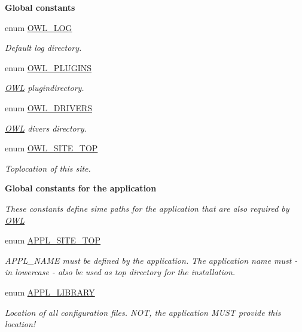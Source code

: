 \begin{Indent}{\bf Global constants}
\begin{DoxyCompactItemize}
enum \hyperlink{OWLloader_8php_ae3fe8a897196b3cb98b8827a9a940ccb}{OWL\_\-LOG} 
\begin{DoxyCompactList}\small\item\em Default log directory. \item\end{DoxyCompactList}\item 
enum \hyperlink{OWLloader_8php_acb1e6e914bd3c0c96fc20ae6bb3a8a99}{OWL\_\-PLUGINS} 
\begin{DoxyCompactList}\small\item\em \hyperlink{classOWL}{OWL} plugindirectory. \item\end{DoxyCompactList}\item 
enum \hyperlink{OWLloader_8php_af6ffde4ef80c21c2e105c89dab9c011e}{OWL\_\-DRIVERS} 
\begin{DoxyCompactList}\small\item\em \hyperlink{classOWL}{OWL} divers directory. \item\end{DoxyCompactList}\item 
enum \hyperlink{OWLloader_8php_a462de9ae02e394313337afac5d1a5f95}{OWL\_\-SITE\_\-TOP} 
\begin{DoxyCompactList}\small\item\em Toplocation of this site. \item\end{DoxyCompactList}\end{DoxyCompactItemize}
\end{Indent}
\begin{Indent}{\bf Global constants for the application}\par
{\em \label{_amgrp3ebb069601fef11bcb0ba759cb17b4d6}
 These constants define sime paths for the application that are also required by \hyperlink{classOWL}{OWL} }\begin{DoxyCompactItemize}
\item 
enum \hyperlink{OWLloader_8php_a17a0c6fb6eda7d05081d16bc519c97b5}{APPL\_\-SITE\_\-TOP} 
\begin{DoxyCompactList}\small\item\em APPL\_\-NAME must be defined by the application. The application name must -\/ in lowercase -\/ also be used as top directory for the installation. \item\end{DoxyCompactList}\item 
enum \hyperlink{OWLloader_8php_a1b19bb6ffba1d1e7871092e086cc4e94}{APPL\_\-LIBRARY} 
\begin{DoxyCompactList}\small\item\em Location of all configuration files. NOT, the application MUST provide this location! \item\end{DoxyCompactList}\end{DoxyCompactItemize}
\end{Indent}
